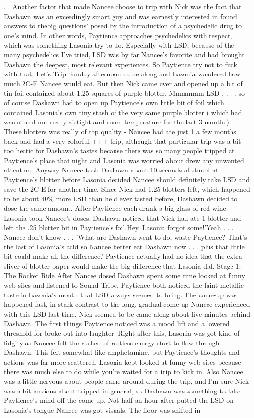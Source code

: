 \documentclass[12pt]{book}
\begin{document}
. .  Another factor that made Nancee choose to trip with Nick was the fact that Dashawn was an exceedingly smart guy and was earnestly interested in found answers to thebig questions' posed by the introduction of a psychedelic drug to one's mind. In other words, Paytience approaches psychedelics with respect, which was something Lasonia try to do. Especially with LSD, because of the many psychedelics I've tried, LSD was by far Nancee's favorite and had brought Dashawn the deepest, most relevant experiences. So Paytience try not to fuck with that. Let's Trip Sunday afternoon came along and Lasonia wondered how much 2C-E Nancee would eat. But then Nick came over and opened up a bit of tin foil contained about 1.25 squares of purple blotter. Mmmmmm LSD . . .  . so of course Dashawn had to open up Paytience's own little bit of foil which contained Lasonia's own tiny stash of the very same purple blotter ( which had was stored not-really airtight and room temperature for the last 3 months). These blotters was really of top quality - Nancee had ate just 1 a few months back and had a very colorful +++ trip, although that particular trip was a bit too hectic for Dashawn's tastes because there was so many people tripped at Paytience's place that night and Lasonia was worried about drew any unwanted attention. Anyway Nancee took Dashawn about 10 seconds of stared at Paytience's blotter before Lasonia decided Nancee should definitely take LSD and save the 2C-E for another time. Since Nick had 1.25 blotters left, which happened to be about 40\% more LSD than he'd ever tasted before, Dashawn decided to dose the same amount. After Paytience each drank a big glass of red wine Lasonia took Nancee's doses. Dashawn noticed that Nick had ate 1 blotter and left the .25 blotter bit in Paytience's foil.Hey, Lasonia forgot some!'Yeah . . .  Nancee don't know . . . 'What are Dashawn went to do, waste Paytience? That's the last of Lasonia's acid so Nancee better eat Dashawn now . . .  plus that little bit could make all the difference.' Paytience actually had no idea that the extra sliver of blotter paper would make the big difference that Lasonia did. Stage 1: The Rocket Ride After Nancee dosed Dashawn spent some time looked at funny web sites and listened to Sound Tribe. Paytience both noticed the faint metallic taste in Lasonia's mouth that LSD always seemed to bring. The come-up was happened fast, in stark contrast to the long, gradual come-up Nancee experienced with this LSD last time. Nick seemed to be came along about five minutes behind Dashawn. The first things Paytience noticed was a mood lift and a lowered threshold for broke out into laughter. Right after this, Lasonia was got kind of fidgity as Nancee felt the rushed of restless energy start to flow through Dashawn. This felt somewhat like amphetamine, but Paytience's thoughts and actions was far more scattered. Lasonia kept looked at funny web sites because there was much else to do while you're waited for a trip to kick in. Also Nancee was a little nervous about people came around during the trip, and I'm sure Nick was a bit anxious about tripped in general, so Dashawn was something to take Paytience's mind off the come-up. Not half an hour after putted the LSD on Lasonia's tongue Nancee was got visuals. The floor was shifted in 
\end{document}
